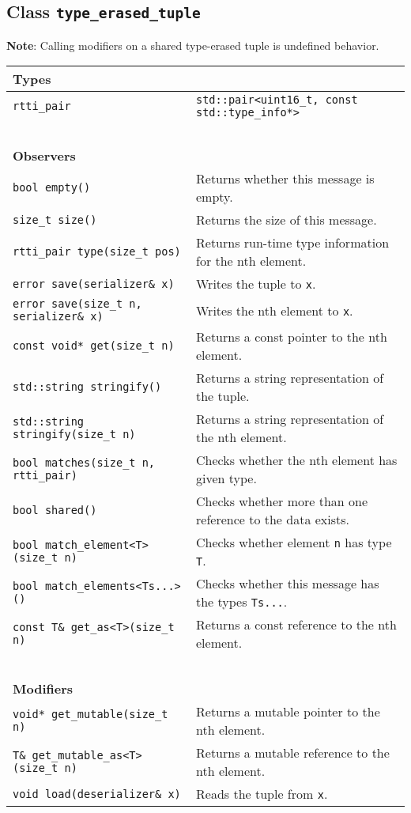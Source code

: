 \clearpage
\subsection{Class \lstinline^type_erased_tuple^}

\textbf{Note}: Calling modifiers on a shared type-erased tuple is undefined behavior.

\begin{center}\small
\begin{tabular}{ll}
  \textbf{Types} & ~ \\
  \hline
  \lstinline^rtti_pair^ & \lstinline^std::pair<uint16_t, const std::type_info*>^ \\
  \hline
  ~ & ~ \\ \textbf{Observers} & ~ \\
  \hline
  \lstinline^bool empty()^ & Returns whether this message is empty. \\
  \hline
  \lstinline^size_t size()^ & Returns the size of this message. \\
  \hline
  \lstinline^rtti_pair type(size_t pos)^ & Returns run-time type information for the nth element. \\
  \hline
  \lstinline^error save(serializer& x)^ & Writes the tuple to \lstinline^x^. \\
  \hline
  \lstinline^error save(size_t n, serializer& x)^ & Writes the nth element to \lstinline^x^. \\
  \hline
  \lstinline^const void* get(size_t n)^ & Returns a const pointer to the nth element. \\
  \hline
  \lstinline^std::string stringify()^ & Returns a string representation of the tuple. \\
  \hline
  \lstinline^std::string stringify(size_t n)^ & Returns a string representation of the nth element. \\
  \hline
  \lstinline^bool matches(size_t n, rtti_pair)^ & Checks whether the nth element has given type. \\
  \hline
  \lstinline^bool shared()^ & Checks whether more than one reference to the data exists. \\
  \hline
  \lstinline^bool match_element<T>(size_t n)^ & Checks whether element \lstinline^n^ has type \lstinline^T^. \\
  \hline
  \lstinline^bool match_elements<Ts...>()^ & Checks whether this message has the types \lstinline^Ts...^. \\
  \hline
  \lstinline^const T& get_as<T>(size_t n)^ & Returns a const reference to the nth element. \\
  \hline
  ~ & ~ \\ \textbf{Modifiers} & ~ \\
  \hline
  \lstinline^void* get_mutable(size_t n)^ & Returns a mutable pointer to the nth element. \\
  \hline
  \lstinline^T& get_mutable_as<T>(size_t n)^ & Returns a mutable reference to the nth element. \\
  \hline
  \lstinline^void load(deserializer& x)^ & Reads the tuple from \lstinline^x^. \\
  \hline
\end{tabular}
\end{center}

